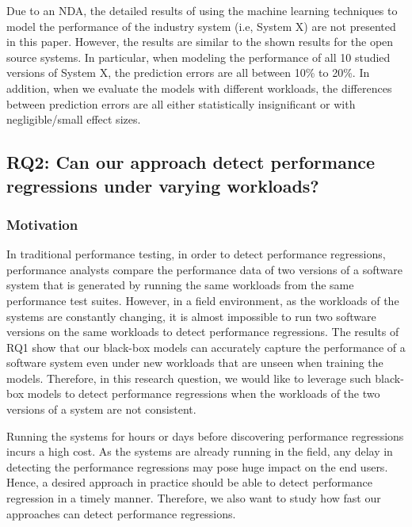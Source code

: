 Due to an NDA, the detailed results of using the machine learning techniques to model the performance of the industry system (i.e, System X) are not presented in this paper. However, the results are similar to the shown results for the open source systems. In particular, when modeling the performance of all 10 studied versions of System X, the prediction errors are all between 10\% to 20\%. In addition, when we evaluate the models with different workloads, the differences between prediction errors are all either statistically insignificant or with negligible/small effect sizes.




\subsection*{RQ2: Can our approach detect performance regressions under varying workloads?}

\subsubsection*{Motivation}

In traditional performance testing, in order to detect performance regressions, performance analysts compare the performance data of two versions of a software system that is generated by running the same workloads from the same performance test suites. 
However, in a field environment, as the workloads of the systems are constantly changing, it is almost impossible to run two software versions on the same workloads to detect performance regressions.
The results of RQ1 show that our black-box models can accurately capture the performance of a software system even under new workloads that are unseen when training the models.
Therefore, in this research question, we would like to leverage such black-box models to detect performance regressions when the workloads of the two versions of a system are not consistent.

Running the systems for hours or days before discovering performance regressions incurs a high cost. As the systems are already running in the field, any delay in detecting the performance regressions may pose huge impact on the end users. Hence, a desired approach in practice should be able to detect performance regression in a timely manner. Therefore, we also want to study how fast our approaches can detect performance regressions. 

